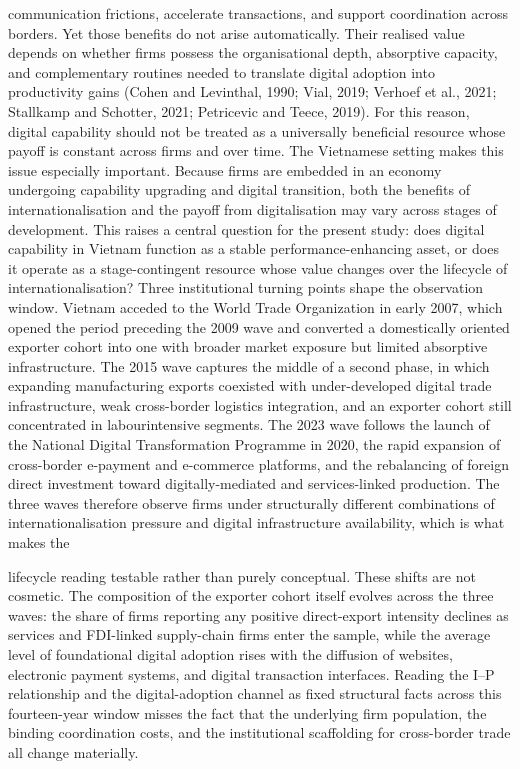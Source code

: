 \documentclass[12pt,a4paper]{article}
\begin{document}
communication frictions, accelerate transactions, and support
coordination across borders. Yet those benefits do not arise
automatically. Their realised value depends on whether firms possess the
organisational depth, absorptive capacity, and complementary routines
needed to translate digital adoption into productivity gains (Cohen and
Levinthal, 1990; Vial, 2019; Verhoef et al., 2021; Stallkamp and
Schotter, 2021; Petricevic and Teece, 2019). For this reason, digital
capability should not be treated as a universally beneficial resource
whose payoff is constant across firms and over time. The Vietnamese
setting makes this issue especially important. Because firms are
embedded in an economy undergoing capability upgrading and digital
transition, both the benefits of internationalisation and the payoff
from digitalisation may vary across stages of development. This raises a
central question for the present study: does digital capability in
Vietnam function as a stable performance-enhancing asset, or does it
operate as a stage-contingent resource whose value changes over the
lifecycle of internationalisation? Three institutional turning points
shape the observation window. Vietnam acceded to the World Trade
Organization in early 2007, which opened the period preceding the 2009
wave and converted a domestically oriented exporter cohort into one with
broader market exposure but limited absorptive infrastructure. The 2015
wave captures the middle of a second phase, in which expanding
manufacturing exports coexisted with under-developed digital trade
infrastructure, weak cross-border logistics integration, and an exporter
cohort still concentrated in labourintensive segments. The 2023 wave
follows the launch of the National Digital Transformation Programme in
2020, the rapid expansion of cross-border e-payment and e-commerce
platforms, and the rebalancing of foreign direct investment toward
digitally-mediated and services-linked production. The three waves
therefore observe firms under structurally different combinations of
internationalisation pressure and digital infrastructure availability,
which is what makes the

lifecycle reading testable rather than purely conceptual. These shifts
are not cosmetic. The composition of the exporter cohort itself evolves
across the three waves: the share of firms reporting any positive
direct-export intensity declines as services and FDI-linked supply-chain
firms enter the sample, while the average level of foundational digital
adoption rises with the diffusion of websites, electronic payment
systems, and digital transaction interfaces. Reading the I--P
relationship and the digital-adoption channel as fixed structural facts
across this fourteen-year window misses the fact that the underlying
firm population, the binding coordination costs, and the institutional
scaffolding for cross-border trade all change materially.
\end{document}
